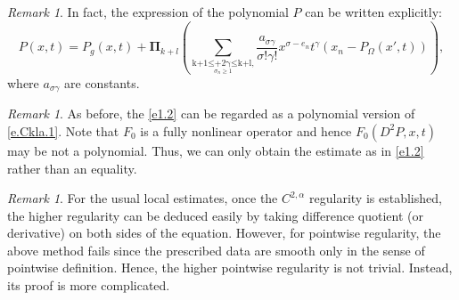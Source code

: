 \documentclass[preprint,12pt]{elsarticle}
\theoremstyle{definition}
\theoremstyle{remark}
\newtheorem{remark}[theorem]{Remark}
\numberwithin{equation}{section}
\begin{document}


\begin{remark}\label{re1.12}
In fact, the expression of the polynomial $P$ can be written explicitly:
\begin{equation}\label{e1.5}
  P(x,t)=P_g(x,t)+\mathbf{\Pi}_{k+l}\left(\sum_{\mathop{k+1\leq |\sigma|+2\gamma\leq k+l,}\limits_{\sigma_n\geq 1}} \frac{a_{\sigma\gamma}}{\sigma!\gamma !}x^{\sigma-e_n}t^{\gamma}\left(x_n-P_{\Omega}(x',t)\right)\right),
\end{equation}
where $a_{\sigma\gamma}$ are constants.
\end{remark}


\begin{remark}\label{re1.14}
As before, the \cref{e1.2} can be regarded as a polynomial version of \cref{e.Ckla.1}. Note that $F_0$ is a fully nonlinear operator and hence $F_0(D^2P,x,t)$ may be not a polynomial. Thus, we can only obtain the estimate as in \cref{e1.2} rather than an equality.
\end{remark}

\begin{remark}\label{re1.8}
For the usual local estimates, once the $C^{2,\alpha}$ regularity is established, the higher regularity can be deduced easily by taking difference quotient (or derivative) on both sides of the equation. However, for pointwise regularity, the above method fails since the prescribed data are smooth only in the sense of pointwise definition. Hence, the higher pointwise regularity is not trivial. Instead, its proof is more complicated.
\end{remark}
~\\
\end{document}
